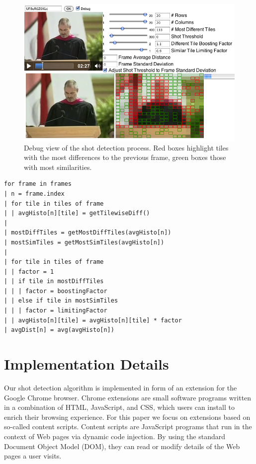 \documentclass{acm_proc_article-sp}
\begin{document}
\begin{figure}
\begin{center}
   \includegraphics[width=0.9\linewidth]{./resources/algorithm.png}
\end{center}
   \caption{Debug view of the shot detection process. Red boxes highlight tiles with the most differences to the previous frame, green boxes those with most similarities.}
\label{fig:algorithm}
\end{figure}

\begin{lstlisting}[caption=Pseudocode of shot detection algorithm., label=code:algorithm, float]
for frame in frames
| n = frame.index  
| for tile in tiles of frame      
| | avgHisto[n][tile] = getTilewiseDiff()
|
| mostDiffTiles = getMostDiffTiles(avgHisto[n])
| mostSimTiles = getMostSimTiles(avgHisto[n])
|
| for tile in tiles of frame    
| | factor = 1  
| | if tile in mostDiffTiles
| | | factor = boostingFactor
| | else if tile in mostSimTiles
| | | factor = limitingFactor
| | avgHisto[n][tile] = avgHisto[n][tile] * factor
| avgDist[n] = avg(avgHisto[n])
\end{lstlisting}

\section{Implementation Details} \label{sec:implementation}
Our shot detection algorithm is implemented in form of an extension for the Google Chrome browser. Chrome extensions are small software programs written in a combination of HTML, JavaScript, and CSS, which users can install to enrich their browsing experience. For this paper we focus on extensions based on so-called content scripts. Content scripts are JavaScript programs that run in the context of Web pages via dynamic code injection. By using the standard Document Object Model (DOM), they can read or modify details of the Web pages a user visits.
\end{document}
